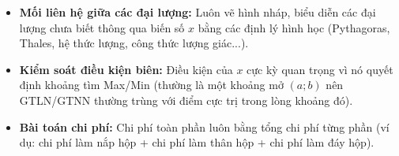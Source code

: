 \documentclass[12pt]{article}
\begin{document}
	\begin{tcolorbox}[colback=yellow!10!white, colframe=orange!60!black,
		fonttitle=\bfseries, title={Tóm tắt kỹ năng giải toán tối ưu hóa}]
		\begin{itemize}
			\item \textbf{Mối liên hệ giữa các đại lượng:} Luôn vẽ hình nháp, biểu diễn các đại lượng chưa biết thông qua biến số $x$ bằng các định lý hình học (Pythagoras, Thales, hệ thức lượng, công thức lượng giác...).
			\item \textbf{Kiểm soát điều kiện biên:} Điều kiện của $x$ cực kỳ quan trọng vì nó quyết định khoảng tìm Max/Min (thường là một khoảng mở $(a; b)$ nên GTLN/GTNN thường trùng với điểm cực trị trong lòng khoảng đó).
			\item \textbf{Bài toán chi phí:} Chi phí toàn phần luôn bằng tổng chi phí từng phần (ví dụ: chi phí làm nắp hộp + chi phí làm thân hộp + chi phí làm đáy hộp).
		\end{itemize}
	\end{tcolorbox}
	
\end{document}
